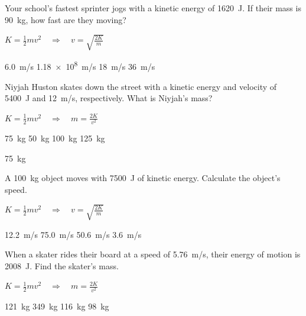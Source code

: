 \documentclass[]{exam}
\begin{document}
\begin{questions}
\question \label{rUr2P8}
Your school's fastest sprinter jogs with a kinetic energy of \SI{1620}{J}. If their mass is \SI{90}{kg}, how fast are they moving?

\ifprintanswers
{\color{red}
$K = \frac{1}{2} m v^2 \quad \Rightarrow \quad v = \sqrt{\frac{2K}{m}}$
}
\fi

\begin{randomizechoices}
    \correctchoice \SI{6.0}{m/s}
    \choice \SI{1.18e8}{m/s}
    \choice \SI{18}{m/s}
    \choice \SI{36}{m/s}
\end{randomizechoices}


\question \label{2rrR9W}
Niyjah Huston skates down the street with a kinetic energy and velocity of \SI{5400}{J} and \SI{12}{m/s}, respectively. What is Niyjah's mass?

\ifprintanswers
{\color{red}
$K = \frac{1}{2} m v^2 \quad \Rightarrow \quad m = \frac{2K}{v^2}$
}
\fi

\begin{randomizechoices}
    \correctchoice \SI{75}{kg}
    \choice \SI{50}{kg}
    \choice \SI{100}{kg}
    \choice \SI{125}{kg}
\end{randomizechoices}

\begin{solution}
\SI{75}{kg}
\end{solution}

\ifprintanswers \else \clearpage \fi 

\question \label{gHlhnM}
A \SI{100}{kg} object moves with \SI{7500}{J} of kinetic energy. Calculate the object's speed.

\ifprintanswers
{\color{red}
$K = \frac{1}{2} m v^2 \quad \Rightarrow \quad v = \sqrt{\frac{2K}{m}}$
}
\fi

\begin{randomizechoices}
    \correctchoice \SI{12.2}{m/s}
    \choice \SI{75.0}{m/s}
    \choice \SI{50.6}{m/s}
    \choice \SI{3.6}{m/s}
\end{randomizechoices}



\question \label{WH6xot}
When a skater rides their board at a speed of \SI{5.76}{m/s}, their energy of motion is \SI{2008}{J}. Find the skater's mass.

\ifprintanswers
{\color{red}
$K = \frac{1}{2} m v^2 \quad \Rightarrow \quad m = \frac{2K}{v^2}$
}
\fi

\begin{randomizechoices}
    \correctchoice \SI{121}{kg}
    \choice \SI{349}{kg}
    \choice \SI{116}{kg}
    \choice \SI{98}{kg}
\end{randomizechoices}


\end{questions}
\end{document}
